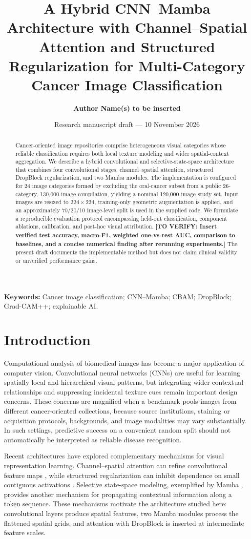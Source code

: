 \documentclass[11pt,a4paper]{article}
\title{A Hybrid CNN--Mamba Architecture with Channel--Spatial Attention and Structured Regularization for Multi-Category Cancer Image Classification}
\author[1]{\textbf{Author Name(s) to be inserted}}
\affil[1]{Department, University/Institute, City, Country\\Corresponding author: \texttt{email@example.org}; ORCID: \texttt{to-be-provided}}
\date{Research manuscript draft --- 10 November 2026}
\newcommand{\todo}[1]{\textcolor{red!70!black}{\textbf{[TO VERIFY: #1]}}}
\begin{document}
\maketitle
\begin{abstract}
Cancer-oriented image repositories comprise heterogeneous visual categories whose reliable classification requires both local texture modeling and wider spatial-context aggregation. We describe a hybrid convolutional and selective-state-space architecture that combines four convolutional stages, channel--spatial attention, structured DropBlock regularization, and two Mamba modules. The implementation is configured for 24 image categories formed by excluding the oral-cancer subset from a public 26-category, 130,000-image compilation, yielding a nominal 120,000-image study set. Input images are resized to $224\times224$, training-only geometric augmentation is applied, and an approximately 70/20/10 image-level split is used in the supplied code. We formulate a reproducible evaluation protocol encompassing held-out classification, component ablations, calibration, and post-hoc visual attribution. \todo{Insert verified test accuracy, macro-F1, weighted one-vs-rest AUC, comparison to baselines, and a concise numerical finding after rerunning experiments.} The present draft documents the implementable method but does not claim clinical validity or unverified performance gains.
\end{abstract}
\noindent\textbf{Keywords:} Cancer image classification; CNN--Mamba; CBAM; DropBlock; Grad-CAM++; explainable AI.

\section{Introduction}\label{sec:intro}
Computational analysis of biomedical images has become a major application of computer vision. Convolutional neural networks (CNNs) are useful for learning spatially local and hierarchical visual patterns, but integrating wider contextual relationships and suppressing incidental texture cues remain important design concerns. These concerns are magnified when a benchmark pools images from different cancer-oriented collections, because source institutions, staining or acquisition protocols, backgrounds, and image modalities may vary substantially. In such settings, predictive success on a convenient random split should not automatically be interpreted as reliable disease recognition.

Recent architectures have explored complementary mechanisms for visual representation learning. Channel--spatial attention can refine convolutional feature maps \citep{woo2018cbam}, while structured regularization can inhibit dependence on small contiguous activations \citep{ghiasi2018dropblock}. Selective state-space modeling, exemplified by Mamba \citep{gu2023mamba}, provides another mechanism for propagating contextual information along a token sequence. These mechanisms motivate the architecture studied here: convolutional layers produce spatial features, two Mamba modules process the flattened spatial grids, and attention with DropBlock is inserted at intermediate feature scales.
\end{document}
